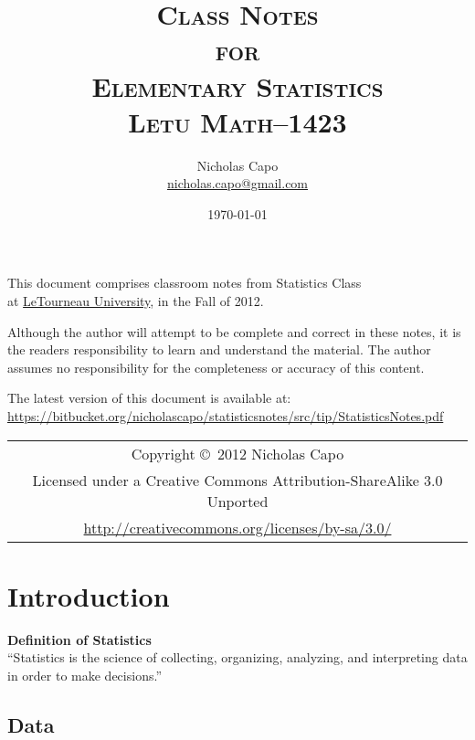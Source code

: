 \documentclass{book}
\title{\textsc{Class Notes\\ for \\ Elementary Statistics\\ Letu Math--1423}}
\author{Nicholas Capo \\ \href{mailto:nicholas.capo@gmail.com}{nicholas.capo@gmail.com}}
\date{\today\\ \currenttime}
\begin{document}
\maketitle
\tableofcontents
\pagebreak

\section*{}
\begin{center}
This document comprises classroom notes from Statistics Class\\ at \href{letu.edu}{LeTourneau University}, in the Fall of 2012.

\vspace{10pt}

Although the author will attempt to be complete and correct in these notes, it is the readers responsibility to learn and understand the material. The author assumes no responsibility for the completeness or accuracy of this content. 

\vspace{10pt}

The latest version of this document is available at:\\ \url{https://bitbucket.org/nicholascapo/statisticsnotes/src/tip/StatisticsNotes.pdf}
\end{center}

\vfill
\begin{tabular}{c}
Copyright \copyright\ 2012 Nicholas Capo\\
Licensed under a {Creative Commons Attribution-ShareAlike 3.0 Unported}\\
\url{http://creativecommons.org/licenses/by-sa/3.0/}\\
\end{tabular}


\newpage
\chapter{Introduction}
\begin{center}
\textbf{Definition of Statistics}\\
\enquote{Statistics is the science of collecting, organizing, analyzing, and interpreting data in order to make decisions.}
\end{center}

\section{Data}
\end{document}
